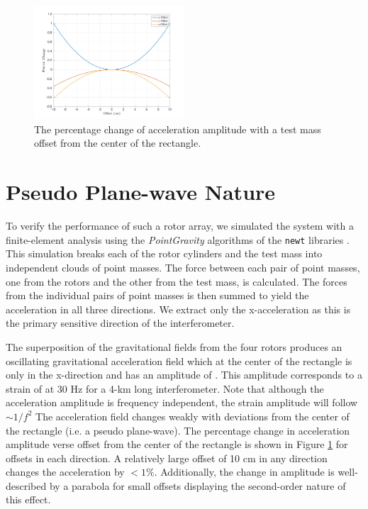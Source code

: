 \documentclass[superscriptaddress, twocolumn, prd]{revtex4-1}
\begin{document}
\begin{figure}[!h]
\centering \includegraphics[width=0.5\textwidth]{Super4_Offset.pdf}
\caption{The percentage change of acceleration amplitude with a test mass offset from the center of the rectangle.}
\label{offset} 
\end{figure}

\section{Pseudo Plane-wave Nature}

To verify the performance of such a rotor array, we simulated the system with a finite-element analysis using the \textit{PointGravity} algorithms of the \texttt{newt} libraries \cite{Hagedorn, pgURL}. This simulation breaks each of the rotor cylinders and the test mass into independent clouds of point masses. The force between each pair of point masses, one from the rotors and the other from the test mass, is calculated. The forces from the individual pairs of point masses is then summed to yield the acceleration in all three directions. We extract only the x-acceleration as this is the primary sensitive direction of the interferometer.

The superposition of the gravitational fields from the four rotors produces an oscillating gravitational acceleration field which at the center of the rectangle is only in the x-direction and has an amplitude of . This amplitude corresponds to a strain of  at 30 Hz for a 4-km long interferometer. Note that although the acceleration amplitude is frequency independent, the strain amplitude will follow $\sim1/f^2$  The acceleration field changes weakly with deviations from the center of the rectangle (i.e. a pseudo plane-wave). The percentage change in acceleration amplitude verse offset from the center of the rectangle is shown in Figure \ref{offset} for offsets in each direction. A relatively large offset of 10 cm in any direction changes the acceleration by $<1\%$. Additionally, the change in amplitude is well-described by a parabola for small offsets displaying the second-order nature of this effect. 
\end{document}
